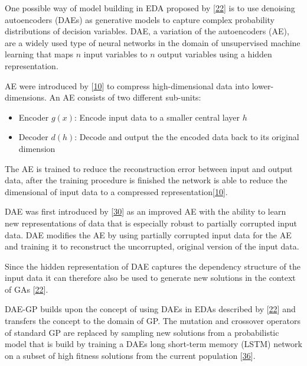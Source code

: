 \documentclass[
  11pt,
]{article}
\providecommand{\tightlist}{%
  \setlength{\itemsep}{0pt}\setlength{\parskip}{0pt}}
\begin{document}
One possible way of model building in EDA proposed by {[}\protect\hyperlink{ref-harmless_overfitting_eda}{22}{]} is to use denoising autoencoders (DAEs) as generative models to capture complex probability distributions of decision variables.
DAE, a variation of the autoencoders (AE), are a widely used type of neural networks in the domain of unsupervised machine learning that maps \(n\) input variables to \(n\) output variables using a hidden representation.

AE were introduced by {[}\protect\hyperlink{ref-ae_orig}{10}{]} to compress high-dimensional data into lower-dimensions.
An AE consists of two different sub-units:

\begin{itemize}
\tightlist
\item
  Encoder \(g(x)\): Encode input data to a smaller central layer \(h\)
\item
  Decoder \(d(h)\): Decode and output the the encoded data back to its original dimension
\end{itemize}

The AE is trained to reduce the reconstruction error between input and output data, after the training procedure is finished the network is able to reduce the dimensional of input data to a compressed representation{[}\protect\hyperlink{ref-ae_orig}{10}{]}.

DAE was first introduced by {[}\protect\hyperlink{ref-dae_orig2008}{30}{]} as an improved AE with the ability to learn new representations of data that is especially robust to partially corrupted input data.
DAE modifies the AE by using partially corrupted input data for the AE and training it to reconstruct the uncorrupted, original version of the input data.

Since the hidden representation of DAE captures the dependency structure of the input data it can therefore also be used to generate new solutions in the context of GAs {[}\protect\hyperlink{ref-harmless_overfitting_eda}{22}{]}.

DAE-GP builds upon the concept of using DAEs in EDAs described by {[}\protect\hyperlink{ref-harmless_overfitting_eda}{22}{]} and transfers the concept to the domain of GP.
The mutation and crossover operators of standard GP are replaced by sampling new solutions from a probabilistic model that is build by training a DAEs long short-term memory (LSTM) network on a subset of high fitness solutions from the current population {[}\protect\hyperlink{ref-dae-gp_2020_rtree}{36}{]}.
\end{document}
